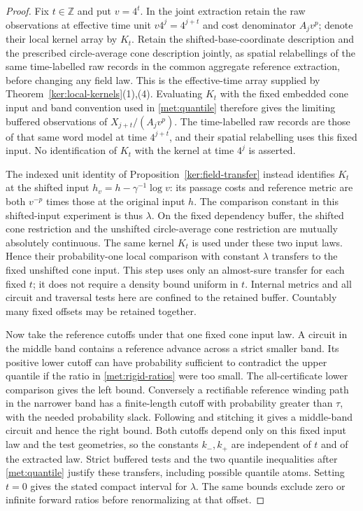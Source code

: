 \begin{proof}
Fix $t\in\mathbb Z$ and put $v=4^t$.  In the joint extraction retain
the raw observations at effective time unit $v4^j=4^{j+t}$ and cost
denominator $A_jv^p$; denote their local kernel array by $K_t$.
Retain the shifted-base-coordinate description and the prescribed
circle-average cone description jointly, as spatial relabellings
of the same time-labelled raw records in the common aggregate
reference extraction, before changing any field law.
This is the effective-time array supplied by
Theorem~\ref{ker:local-kernels}(1),(4).  Evaluating $K_t$ with the
fixed embedded cone input and band convention used in
\eqref{met:quantile} therefore gives the limiting buffered
observations of $X_{j+t}/(A_jv^p)$.  The time-labelled raw records
are those of that same word model at time $4^{j+t}$, and their spatial
relabelling uses this fixed input.  No identification of $K_t$ with
the kernel at time $4^j$ is asserted.

The indexed unit identity of Proposition~\ref{ker:field-transfer}
instead identifies $K_t$ at the shifted input
$h_v=h-\gamma^{-1}\log v$: its passage costs and reference metric
are both $v^{-p}$ times those at the original input $h$.
The comparison constant in this shifted-input experiment is thus
$\lambda$.  On the fixed dependency buffer, the shifted cone
restriction and the unshifted circle-average cone restriction are
mutually absolutely continuous.  The same kernel $K_t$ is used under
these two input laws.  Hence their probability-one local comparison
with constant $\lambda$ transfers to the fixed unshifted cone input.
This step uses only an almost-sure transfer for each fixed $t$;
it does not require a density bound uniform in $t$.  Internal metrics
and all circuit and traversal tests here are confined to the retained
buffer.  Countably many fixed offsets may be retained together.

Now take the reference cutoffs under that one fixed cone input law.
A circuit in the middle band contains a reference advance across
a strict smaller band.  Its positive lower cutoff can have probability
sufficient to contradict the upper quantile if the ratio in
\eqref{met:rigid-ratios} were too small.  The all-certificate lower
comparison gives the left bound.  Conversely a rectifiable reference
winding path in the narrower band has a finite-length cutoff with
probability greater than $\tau$, with the needed probability slack.
Following and stitching it gives a middle-band circuit and hence the
right bound.  Both cutoffs depend only on this fixed input law and
the test geometries, so the constants $k_-,k_+$ are independent of
$t$ and of the extracted law.  Strict buffered tests and the two
quantile inequalities after \eqref{met:quantile} justify these
transfers, including possible quantile atoms.  Setting $t=0$ gives
the stated compact interval for $\lambda$.  The same bounds exclude
zero or infinite forward ratios before renormalizing at that offset.
\end{proof}

